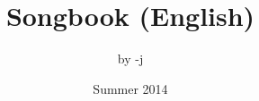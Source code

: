 \documentclass[11pt,a4paper,openany]{book}  %
\begin{document}
\Large

\title{Songbook (English)}
\author{by -j} 
\date{Summer 2014}

\maketitle
\cleardoublepage
\tableofcontents
\newpage  %

\end{document}
